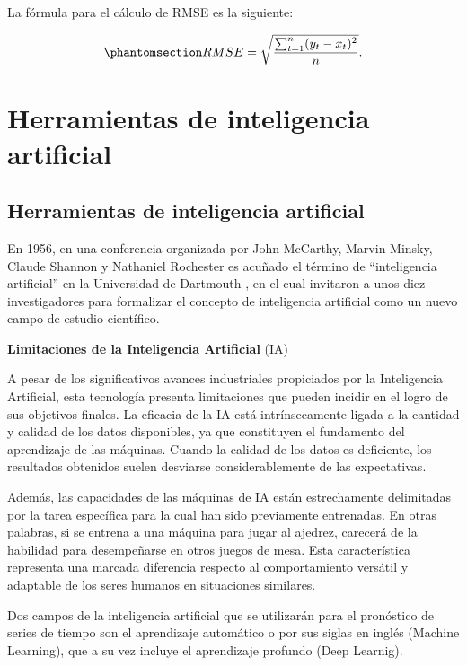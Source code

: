 \documentclass[
  us-letterpaper,
]{scrreprt}
\theoremstyle{plain}
\theoremstyle{definition}
\theoremstyle{definition}
\theoremstyle{remark}
\begin{document}
La fórmula para el cálculo de RMSE es la siguiente:

\begin{equation}\phantomsection\label{eq-frmse}{ RMSE = \sqrt{  \dfrac{\sum_{t=1}^{n} (y_t - x_t)^2}{n }}.
}\end{equation}

\part{Herramientas de inteligencia artificial}

\chapter{Herramientas de inteligencia
artificial}\label{herramientas-de-inteligencia-artificial-1}

En 1956, en una conferencia organizada por John McCarthy, Marvin Minsky,
Claude Shannon y Nathaniel Rochester es acuñado el término de
``inteligencia artificial'' en la Universidad de Dartmouth
\autocite{moor2006dartmouth}, en el cual invitaron a unos diez
investigadores para formalizar el concepto de inteligencia artificial
como un nuevo campo de estudio científico.

\textbf{Limitaciones de la Inteligencia Artificial} (IA)

A pesar de los significativos avances industriales propiciados por la
Inteligencia Artificial, esta tecnología presenta limitaciones que
pueden incidir en el logro de sus objetivos finales. La eficacia de la
IA está intrínsecamente ligada a la cantidad y calidad de los datos
disponibles, ya que constituyen el fundamento del aprendizaje de las
máquinas. Cuando la calidad de los datos es deficiente, los resultados
obtenidos suelen desviarse considerablemente de las expectativas.

Además, las capacidades de las máquinas de IA están estrechamente
delimitadas por la tarea específica para la cual han sido previamente
entrenadas. En otras palabras, si se entrena a una máquina para jugar al
ajedrez, carecerá de la habilidad para desempeñarse en otros juegos de
mesa. Esta característica representa una marcada diferencia respecto al
comportamiento versátil y adaptable de los seres humanos en situaciones
similares.

Dos campos de la inteligencia artificial que se utilizarán para el
pronóstico de series de tiempo son el aprendizaje automático o por sus
siglas en inglés (Machine Learning), que a su vez incluye el aprendizaje
profundo (Deep Learnig).
\end{document}
